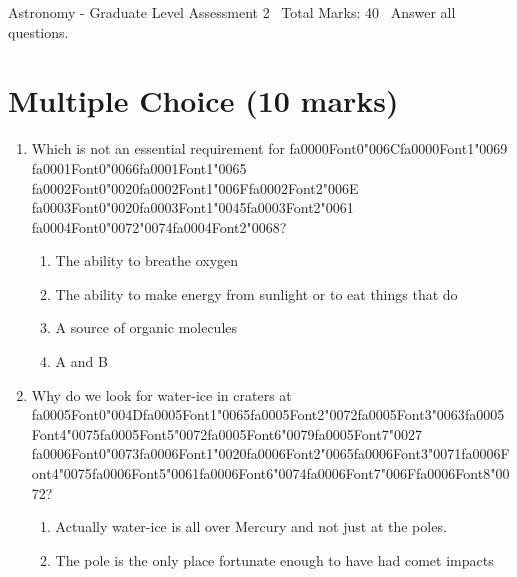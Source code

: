 \documentclass[12pt]{article}
\begin{document}
\begin{center}
Astronomy - Graduate Level Assessment 2 \
Total Marks: 40 \
Answer all questions.
\end{center}

\section*{Multiple Choice (10 marks)}
\begin{enumerate}[label=\arabic*.]
\item Which is not an essential requirement for {\csname fa0000Font0\endcsname\char"006C}{\csname fa0000Font1\endcsname\char"0069} {\csname fa0001Font0\endcsname\char"0066}{\csname fa0001Font1\endcsname\char"0065} {\csname fa0002Font0\endcsname\char"0020}{\csname fa0002Font1\endcsname\char"006F}{\csname fa0002Font2\endcsname\char"006E} {\csname fa0003Font0\endcsname\char"0020}{\csname fa0003Font1\endcsname\char"0045}{\csname fa0003Font2\endcsname\char"0061} {\csname fa0004Font0\endcsname\char"0072}{\char"0074}{\csname fa0004Font2\endcsname\char"0068}?
\begin{enumerate}[label=(\alph*)]
    \item The ability to breathe oxygen
    \item The ability to make energy from sunlight or to eat things that do
    \item A source of organic molecules
    \item A and B
\end{enumerate}
\item Why do we look for water-ice in craters at {\csname fa0005Font0\endcsname\char"004D}{\csname fa0005Font1\endcsname\char"0065}{\csname fa0005Font2\endcsname\char"0072}{\csname fa0005Font3\endcsname\char"0063}{\csname fa0005Font4\endcsname\char"0075}{\csname fa0005Font5\endcsname\char"0072}{\csname fa0005Font6\endcsname\char"0079}{\csname fa0005Font7\endcsname\char"0027} {\csname fa0006Font0\endcsname\char"0073}{\csname fa0006Font1\endcsname\char"0020}{\csname fa0006Font2\endcsname\char"0065}{\csname fa0006Font3\endcsname\char"0071}{\csname fa0006Font4\endcsname\char"0075}{\csname fa0006Font5\endcsname\char"0061}{\csname fa0006Font6\endcsname\char"0074}{\csname fa0006Font7\endcsname\char"006F}{\csname fa0006Font8\endcsname\char"0072}?
\begin{enumerate}[label=(\alph*)]
    \item Actually water-ice is all over Mercury and not just at the poles.
    \item The pole is the only place fortunate enough to have had comet impacts

\end{enumerate}
\end{enumerate}
\end{document}
